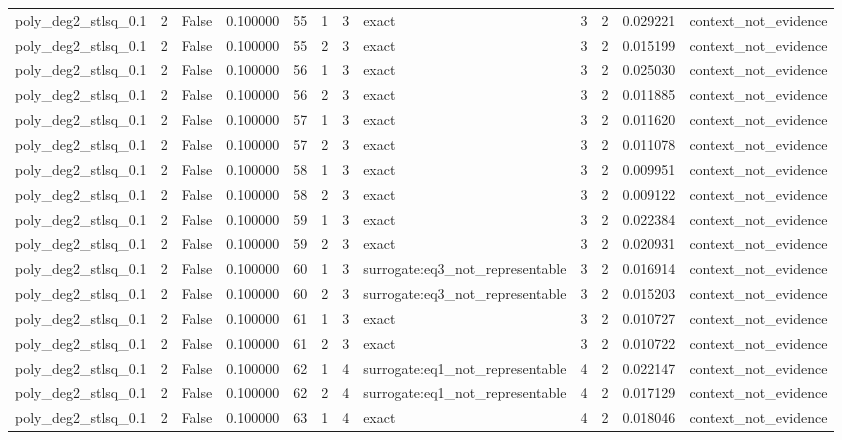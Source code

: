 \begin{tabular}{lrrrrrrlrrrl}
poly\_deg2\_stlsq\_0.1 & 2 & False & 0.100000 & 55 & 1 & 3 & exact & 3 & 2 & 0.029221 & context\_not\_evidence \\
poly\_deg2\_stlsq\_0.1 & 2 & False & 0.100000 & 55 & 2 & 3 & exact & 3 & 2 & 0.015199 & context\_not\_evidence \\
poly\_deg2\_stlsq\_0.1 & 2 & False & 0.100000 & 56 & 1 & 3 & exact & 3 & 2 & 0.025030 & context\_not\_evidence \\
poly\_deg2\_stlsq\_0.1 & 2 & False & 0.100000 & 56 & 2 & 3 & exact & 3 & 2 & 0.011885 & context\_not\_evidence \\
poly\_deg2\_stlsq\_0.1 & 2 & False & 0.100000 & 57 & 1 & 3 & exact & 3 & 2 & 0.011620 & context\_not\_evidence \\
poly\_deg2\_stlsq\_0.1 & 2 & False & 0.100000 & 57 & 2 & 3 & exact & 3 & 2 & 0.011078 & context\_not\_evidence \\
poly\_deg2\_stlsq\_0.1 & 2 & False & 0.100000 & 58 & 1 & 3 & exact & 3 & 2 & 0.009951 & context\_not\_evidence \\
poly\_deg2\_stlsq\_0.1 & 2 & False & 0.100000 & 58 & 2 & 3 & exact & 3 & 2 & 0.009122 & context\_not\_evidence \\
poly\_deg2\_stlsq\_0.1 & 2 & False & 0.100000 & 59 & 1 & 3 & exact & 3 & 2 & 0.022384 & context\_not\_evidence \\
poly\_deg2\_stlsq\_0.1 & 2 & False & 0.100000 & 59 & 2 & 3 & exact & 3 & 2 & 0.020931 & context\_not\_evidence \\
poly\_deg2\_stlsq\_0.1 & 2 & False & 0.100000 & 60 & 1 & 3 & surrogate:eq3\_not\_representable & 3 & 2 & 0.016914 & context\_not\_evidence \\
poly\_deg2\_stlsq\_0.1 & 2 & False & 0.100000 & 60 & 2 & 3 & surrogate:eq3\_not\_representable & 3 & 2 & 0.015203 & context\_not\_evidence \\
poly\_deg2\_stlsq\_0.1 & 2 & False & 0.100000 & 61 & 1 & 3 & exact & 3 & 2 & 0.010727 & context\_not\_evidence \\
poly\_deg2\_stlsq\_0.1 & 2 & False & 0.100000 & 61 & 2 & 3 & exact & 3 & 2 & 0.010722 & context\_not\_evidence \\
poly\_deg2\_stlsq\_0.1 & 2 & False & 0.100000 & 62 & 1 & 4 & surrogate:eq1\_not\_representable & 4 & 2 & 0.022147 & context\_not\_evidence \\
poly\_deg2\_stlsq\_0.1 & 2 & False & 0.100000 & 62 & 2 & 4 & surrogate:eq1\_not\_representable & 4 & 2 & 0.017129 & context\_not\_evidence \\
poly\_deg2\_stlsq\_0.1 & 2 & False & 0.100000 & 63 & 1 & 4 & exact & 4 & 2 & 0.018046 & context\_not\_evidence \\

\end{tabular}
